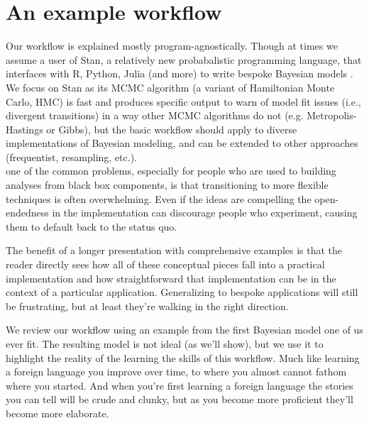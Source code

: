 \documentclass[11pt]{article}
\begin{document}


\section*{An example workflow}

Our workflow is explained mostly program-agnostically. Though at times we assume a user of \textsf{Stan}, a relatively new probabalistic programming language, that interfaces with \textsf{R, Python, Julia} (and more) to write bespoke Bayesian models \citep{Carpenter:2017stan}. We focus on \textsf{Stan} as its MCMC algorithm (a variant of Hamiltonian Monte Carlo, HMC) is fast and produces specific output to warn of model fit issues (i.e., divergent transitions) in a way other MCMC algorithms do not (e.g. Metropolis-Hastings or Gibbs), but the basic workflow should apply to diverse implementations of Bayesian modeling, and can be extended to other approaches (frequentist, resampling, etc.). \\ %

one of the common problems, especially for people who are used to building analyses from black box components, is that transitioning to more flexible techniques is often overwhelming.  Even if the ideas are compelling the open-endedness in the implementation can discourage people who experiment, causing them to default back to the status quo.

The benefit of a longer presentation with comprehensive examples is that the reader directly sees how all of these conceptual pieces fall into a practical implementation and how straightforward that implementation can be in the context of a particular application.  Generalizing to bespoke applications will still be frustrating, but at least they're walking in the right direction.


We review our workflow using an example from the first Bayesian model one of us ever fit. The resulting model is not ideal (as we'll show), but we use it to highlight the reality of the learning the skills of this workflow. Much like learning a foreign language you improve over time, to where you almost cannot fathom where you started. And when you're first learning a foreign language the stories you can tell will be crude and  clunky, but as you become more proficient they'll become more elaborate.
\end{document}
